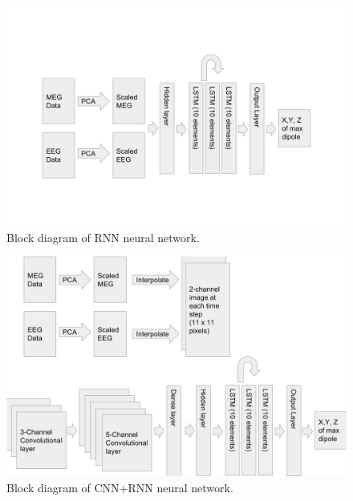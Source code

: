 \documentclass[journal]{IEEEtran}
\begin{document}
\begin{figure}[h!]
\centering
\includegraphics[width=5in]{rnn}
\caption{Block diagram of RNN neural network.}
\label{fig:rnn}
\end{figure}

\begin{figure}[h!]
\centering
\includegraphics[width=5in]{cnnrnn}
\caption{Block diagram of CNN+RNN neural network.}
\label{fig:cnnrnn}
\end{figure}
\end{document}
